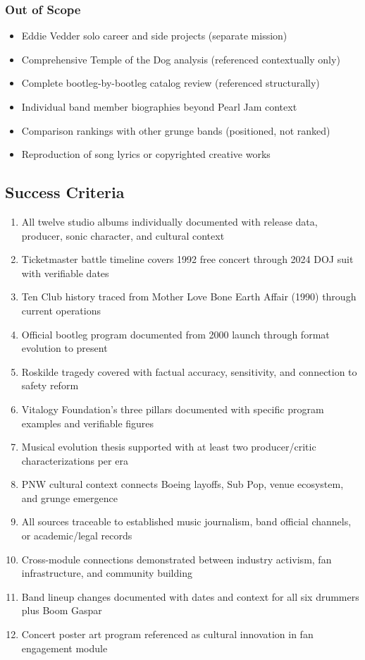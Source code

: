 \documentclass[11pt,letterpaper]{article}
\begin{document}
\subsubsection{Out of Scope}

\begin{itemize}[leftmargin=2em]
\item Eddie Vedder solo career and side projects (separate mission)
\item Comprehensive Temple of the Dog analysis (referenced contextually only)
\item Complete bootleg-by-bootleg catalog review (referenced structurally)
\item Individual band member biographies beyond Pearl Jam context
\item Comparison rankings with other grunge bands (positioned, not ranked)
\item Reproduction of song lyrics or copyrighted creative works
\end{itemize}

\subsection{Success Criteria}

\begin{enumerate}[label=\textbf{\arabic*.}]
\item All twelve studio albums individually documented with release data, producer, sonic character, and cultural context
\item Ticketmaster battle timeline covers 1992 free concert through 2024 DOJ suit with verifiable dates
\item Ten Club history traced from Mother Love Bone Earth Affair (1990) through current operations
\item Official bootleg program documented from 2000 launch through format evolution to present
\item Roskilde tragedy covered with factual accuracy, sensitivity, and connection to safety reform
\item Vitalogy Foundation's three pillars documented with specific program examples and verifiable figures
\item Musical evolution thesis supported with at least two producer/critic characterizations per era
\item PNW cultural context connects Boeing layoffs, Sub Pop, venue ecosystem, and grunge emergence
\item All sources traceable to established music journalism, band official channels, or academic/legal records
\item Cross-module connections demonstrated between industry activism, fan infrastructure, and community building
\item Band lineup changes documented with dates and context for all six drummers plus Boom Gaspar
\item Concert poster art program referenced as cultural innovation in fan engagement module
\end{enumerate}
\end{document}
